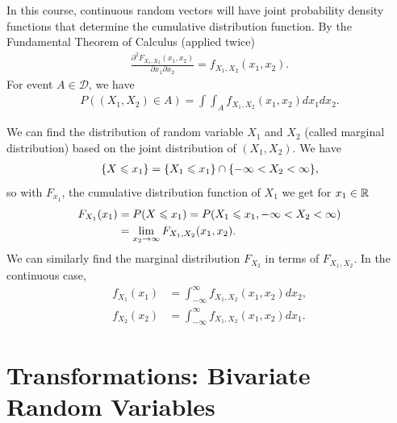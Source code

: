 \begin{remark}
    In this course, continuous random vectors will have joint probability
    density functions that determine the cumulative distribution function. By the
    Fundamental Theorem of Calculus (applied twice)
    \begin{align*}
        \frac{\partial^2 F_{X_1,X_2}(x_1,x_2)}{\partial x_1\partial x_2}=f_{X_1,X_2}(x_1,x_2).
    \end{align*}
    For event $A\in\mathcal{D}$, we have 
    \begin{align*}
        P((X_1,X_2)\in A)=\int\int_{A} f_{X_1,X_2}(x_1,x_2)dx_1dx_2.
    \end{align*}
\end{remark}



\begin{remark}
    We can find the distribution of random variable $X_1$ and $X_2$ 
    (called marginal distribution) based on the joint distribution of $(X_1,X_2)$.
    We have
    \begin{align*}
        \{X\leqslant x_1\} = \{X_1\leqslant x_1\}\cap \{-\infty<X_2<\infty\},
    \end{align*}
    so with $F_{x_1}$, the cumulative distribution function of $X_1$ we get for $x_1\in\mathbb{R}$
    \begin{align*}
        F_{X_1}(x_1) &= P(X\leqslant x_1)=P(X_1\leqslant x_1,-\infty<X_2<\infty)\\
                    &= \lim_{x_2\rightarrow \infty} F_{X_1,X_2}(x_1,x_2).
    \end{align*}
    We can similarly find the marginal distribution $F_{X_2}$ in terms of $F_{X_1,X_2}$.
    In the continuous case,
    \begin{align*}
        f_{X_1}(x_1)&=\int_{-\infty}^{\infty} f_{X_1,X_2}(x_1,x_2)dx_2,\\
        f_{X_2}(x_2)&=\int_{-\infty}^{\infty} f_{X_1,X_2}(x_1,x_2)dx_1.
    \end{align*}
\end{remark}


\section{Transformations: Bivariate Random Variables}

